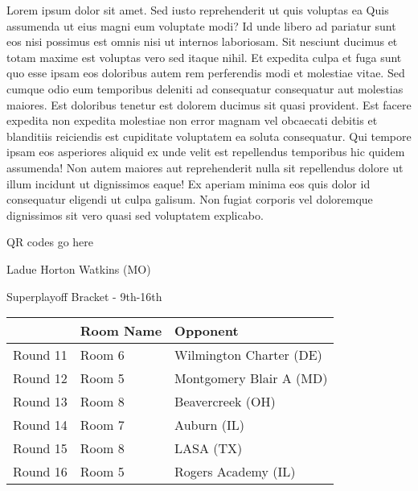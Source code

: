 \documentclass{article}%
\begin{document}
\vspace*{8pt}%
\linebreak%
\newline%
\newline%
    Lorem ipsum dolor sit amet. Sed iusto reprehenderit ut quis voluptas ea Quis assumenda ut eius magni eum voluptate modi? Id unde libero ad pariatur sunt eos nisi possimus est omnis nisi ut internos laboriosam. Sit nesciunt ducimus et totam maxime est voluptas vero sed itaque nihil. Et expedita culpa et fuga sunt quo esse ipsam eos doloribus autem rem perferendis modi et molestiae vitae.\newline%
\newline%
    Sed cumque odio eum temporibus deleniti ad consequatur consequatur aut molestias maiores. Est doloribus tenetur est dolorem ducimus sit quasi provident. Est facere expedita non expedita molestiae non error magnam vel obcaecati debitis et blanditiis reiciendis est cupiditate voluptatem ea soluta consequatur. Qui tempore ipsam eos asperiores aliquid ex unde velit est repellendus temporibus hic quidem assumenda!\newline%
\newline%
    Non autem maiores aut reprehenderit nulla sit repellendus dolore ut illum incidunt ut dignissimos eaque! Ex aperiam minima eos quis dolor id consequatur eligendi ut culpa galisum. Non fugiat corporis vel doloremque dignissimos sit vero quasi sed voluptatem explicabo.\newline%
\newline%
\vspace*{30pt}%
\begin{center}%
\begin{Huge}%
QR codes go here%
\end{Huge}%
\end{center}%
\newpage%
\begin{center}%
\begin{Huge}%
Ladue Horton Watkins (MO)%
\end{Huge}%
\vspace*{8pt}%
\linebreak%
\begin{Large}%
Superplayoff Bracket {-} 9th{-}16th%
\end{Large}%
\end{center}%
%
\begin{tabularx}{\textwidth}{|c|Y|Y|}%
\hline%
&Room Name&Opponent\\%
\hline%
Round 11&Room 6&Wilmington Charter (DE)\\%
Round 12&Room 5&Montgomery Blair A (MD)\\%
Round 13&Room 8&Beavercreek (OH)\\%
Round 14&Room 7&Auburn (IL)\\%
Round 15&Room 8&LASA (TX)\\%
Round 16&Room 5&Rogers Academy (IL)\\%
\hline%
\end{tabularx}%
\end{document}
